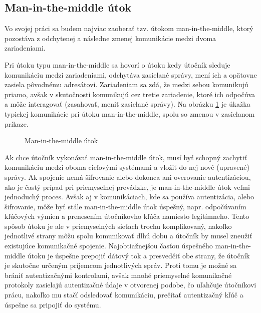 \subsection{Man-in-the-middle útok}
\tab Vo svojej práci sa budem najviac zaoberať tzv. útokom man-in-the-middle, ktorý pozostáva z odchytenej a následne zmenej komunikácie medzi dvoma zariadeniami. \par
Pri útoku typu man-in-the-middle sa hovorí o útoku kedy útočník sleduje komunikáciu medzi zariadeniami, odchytáva zasielané správy, mení ich a opätovne zasiela pôvodnému adresátovi. Zariadeniam sa zdá, že medzi sebou komunikujú priamo, avšak v skutočnosti komunikujú cez tretie zariadenie, ktoré ich odpočúva a môže interagovať (zasahovať, meniť zasielané správy). Na obrázku \ref{mitm} je úkažka typickej komunikácie pri útoku man-in-the-middle, spolu so zmenou v zasielanom príkaze. \par
\begin{figure}[H]
    \centering
    \caption{Man-in-the-middle útok}
\label{mitm}
\end{figure}
Ak chce útočník vykonávať man-in-the-middle útok, musí byť schopný zachytiť komunikáciu medzi oboma cieľovými systémami a vložiť do nej nové (upravené) správy. Ak spojenie nemá šifrovanie alebo dokonca ani overovanie autentizáciou, ako je častý prípad pri priemyselnej prevádzke, je man-in-the-middle útok veľmi jednoduchý proces. Avšak aj v komunikáciach, kde sa používa autentizácia, alebo šifrovanie, môže byť stále man-in-the-middle útok úspešný, napr. odpočúvaním kľúčových výmien a prenesením útočníkovho kľúča namiesto legitímneho. Tento spôsob útoku je ale v priemyselných sieťach trochu komplikovaný, nakoľko jednotlivé strany môžu spolu komunikovať dlhú dobu a útočník by musel zneužiť existujúce komunikačné spojenie. Najobtiažnejšou časťou úspešného man-in-the-middle útoku je úspešne prepojiť dátový tok a presvedčiť obe strany, že útočník je skutočne určeným príjemcom jednotlivých správ. Proti tomu je možné sa brániť autentizačnými kontrolami, avšak mnohé priemyselné komunikačné protokoly zasielajú autentizačné údaje v otvorenej podobe, čo uľahčuje útočníkovi prácu, nakoľko mu stačí odsledovať komunikáciu, prečítať autentizačný kľúč a úspešne sa pripojiť do systému\cite{Security}.

